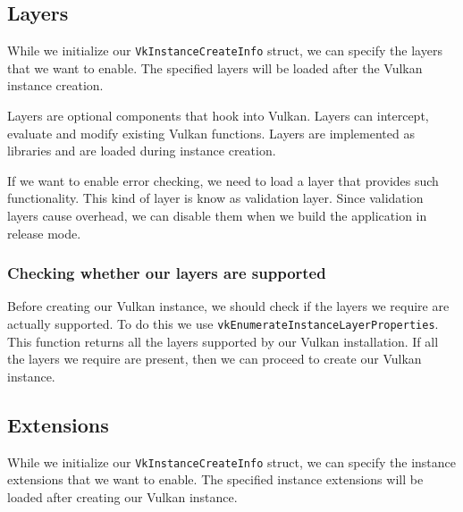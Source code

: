 \begin{minipage}{\linewidth}{\noindent}
    
\end{minipage}

\subsection{Layers}

While we initialize our \texttt{VkInstanceCreateInfo} struct, we can specify the layers
that we want to enable.
The specified layers will be loaded after the Vulkan instance creation.

Layers are optional components that hook into Vulkan.
Layers can intercept, evaluate and modify existing Vulkan functions.
Layers are implemented as libraries and are loaded during instance creation.

If we want to enable error checking, we need to load a layer that
provides such functionality.
This kind of layer is know as validation layer.
Since validation layers cause overhead, we can
disable them when we build the application in release mode.

\begin{minipage}{\linewidth}{\noindent}
    
\end{minipage}

\subsubsection{Checking whether our layers are supported}

Before creating our Vulkan instance, we should check if the layers we require are
actually supported.
To do this we use \texttt{vkEnumerateInstanceLayerProperties}.
This function returns all the layers supported by our Vulkan installation.
If all the layers we require are present, then we can proceed to create our
Vulkan instance.

\subsection{Extensions}

While we initialize our \texttt{VkInstanceCreateInfo} struct, we can specify the instance
extensions that we want to enable.
The specified instance extensions will be loaded after creating our Vulkan instance.

